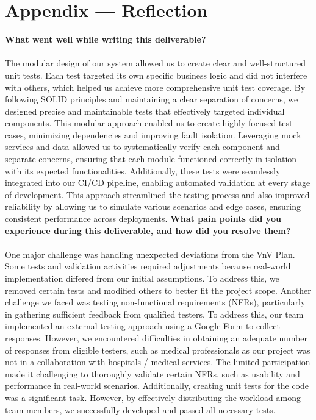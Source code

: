 \documentclass[12pt, titlepage]{article}
\begin{document}
\newpage{}
\section*{Appendix --- Reflection}
  \textbf{What went well while writing this deliverable?} \\\\
  The modular design of our system allowed us to create clear and well-structured unit tests. Each test targeted its own specific business logic and did not interfere with others, which helped us achieve more comprehensive unit test coverage. By following SOLID principles and maintaining a clear separation of concerns, we designed precise and maintainable tests that effectively targeted individual components. This modular approach enabled us to create highly focused test cases, minimizing dependencies and improving fault isolation. Leveraging mock services and data allowed us to systematically verify each component and separate concerns, ensuring that each module functioned correctly in isolation with its expected functionalities. Additionally, these tests were seamlessly integrated into our CI/CD pipeline, enabling automated validation at every stage of development. This approach streamlined the testing process and also improved reliability by allowing us to simulate various scenarios and edge cases, ensuring consistent performance across deployments.
  \newline \newline \textbf{What pain points did you experience during this deliverable, and how did you resolve them?} \\\\
  One major challenge was handling unexpected deviations from the VnV Plan. Some tests and validation activities required adjustments because real-world implementation differed from our initial assumptions. To address this, we removed certain tests and modified others to better fit the project scope. Another challenge we faced was testing non-functional requirements (NFRs), particularly in gathering sufficient feedback from qualified testers. To address this, our team implemented an external testing approach using a Google Form to collect responses. However, we encountered difficulties in obtaining an adequate number of responses from eligible testers, such as medical professionals as our project was not in a collaboration with hospitals / medical services. The limited participation made it challenging to thoroughly validate certain NFRs, such as usability and performance in real-world scenarios. Additionally, creating unit tests for the code was a significant task. However, by effectively distributing the workload among team members, we successfully developed and passed all necessary tests.
\end{document}
